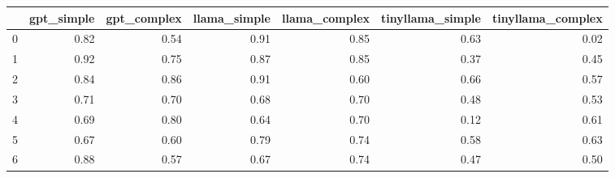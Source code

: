 \begin{tabular}{lrrrrrr}
\toprule
 & gpt_simple & gpt_complex & llama_simple & llama_complex & tinyllama_simple & tinyllama_complex \\
\midrule
0 & 0.82 & 0.54 & 0.91 & 0.85 & 0.63 & 0.02 \\
1 & 0.92 & 0.75 & 0.87 & 0.85 & 0.37 & 0.45 \\
2 & 0.84 & 0.86 & 0.91 & 0.60 & 0.66 & 0.57 \\
3 & 0.71 & 0.70 & 0.68 & 0.70 & 0.48 & 0.53 \\
4 & 0.69 & 0.80 & 0.64 & 0.70 & 0.12 & 0.61 \\
5 & 0.67 & 0.60 & 0.79 & 0.74 & 0.58 & 0.63 \\
6 & 0.88 & 0.57 & 0.67 & 0.74 & 0.47 & 0.50 \\
\bottomrule
\end{tabular}
